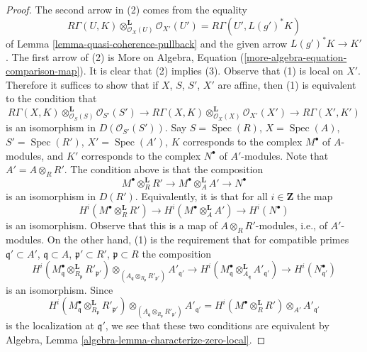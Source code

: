 \documentclass{stacks-project}
\theoremstyle{plain}
\theoremstyle{definition}
\theoremstyle{remark}
\numberwithin{equation}{subsection}
\def\Spec{\mathop{\mathrm{Spec}}}
\begin{document}
\begin{proof}
The second arrow in (2) comes from the equality
$$
R\Gamma(U, K) \otimes_{\mathcal{O}_X(U)}^\mathbf{L} \mathcal{O}_{X'}(U') =
R\Gamma(U', L(g')^*K)
$$
of Lemma \ref{lemma-quasi-coherence-pullback} and the given arrow
$L(g')^*K \to K'$. The first arrow of (2) is
More on Algebra, Equation (\ref{more-algebra-equation-comparison-map}).
It is clear that (2) implies (3). Observe that (1) is local on $X'$.
Therefore it suffices to show that if $X$, $S$, $S'$, $X'$ are affine, then
(1) is equivalent to the condition that
$$
R\Gamma(X, K) \otimes_{\mathcal{O}_S(S)}^\mathbf{L} \mathcal{O}_{S'}(S')
\to
R\Gamma(X, K) \otimes_{\mathcal{O}_X(X)}^\mathbf{L} \mathcal{O}_{X'}(X')
\to
R\Gamma(X', K')
$$
is an isomorphism in $D(\mathcal{O}_{S'}(S'))$. Say
$S = \Spec(R)$, $X = \Spec(A)$, $S' = \Spec(R')$, $X' = \Spec(A')$,
$K$ corresponds to the complex $M^\bullet$ of $A$-modules, and
$K'$ corresponds to the complex $N^\bullet$ of $A'$-modules.
Note that $A' = A \otimes_R R'$. The condition above is that the composition
$$
M^\bullet \otimes_R^\mathbf{L} R' \to
M^\bullet \otimes_A^\mathbf{L} A' \to
N^\bullet
$$
is an isomorphism in $D(R')$. Equivalently, it is that for all
$i \in \mathbf{Z}$ the map
$$
H^i(M^\bullet \otimes_R^\mathbf{L} R') \to
H^i(M^\bullet \otimes_A^\mathbf{L} A') \to
H^i(N^\bullet)
$$
is an isomorphism. Observe that this is a map of $A \otimes_R R'$-modules,
i.e., of $A'$-modules. On the other hand, (1) is the requirement
that for compatible primes
$\mathfrak q' \subset A'$, $\mathfrak q \subset A$,
$\mathfrak p' \subset R'$, $\mathfrak p \subset R$
the composition
$$
H^i(M^\bullet_\mathfrak q \otimes_{R_\mathfrak p}^\mathbf{L} R'_{\mathfrak p'})
\otimes_{(A_\mathfrak q \otimes_{R_\mathfrak p} R'_{\mathfrak p'})}
A'_{\mathfrak q'} \to
H^i(M^\bullet_{\mathfrak q}
\otimes_{A_\mathfrak q}^\mathbf{L} A'_{\mathfrak q'})
\to H^i(N^\bullet_{\mathfrak q'})
$$
is an isomorphism. Since
$$
H^i(M^\bullet_\mathfrak q \otimes_{R_\mathfrak p}^\mathbf{L} R'_{\mathfrak p'})
\otimes_{(A_\mathfrak q \otimes_{R_\mathfrak p} R'_{\mathfrak p'})}
A'_{\mathfrak q'} =
H^i(M^\bullet \otimes_R^\mathbf{L} R') \otimes_{A'} A'_{\mathfrak q'}
$$
is the localization at $\mathfrak q'$,
we see that these two conditions are equivalent by
Algebra, Lemma \ref{algebra-lemma-characterize-zero-local}.
\end{proof}
\end{document}
